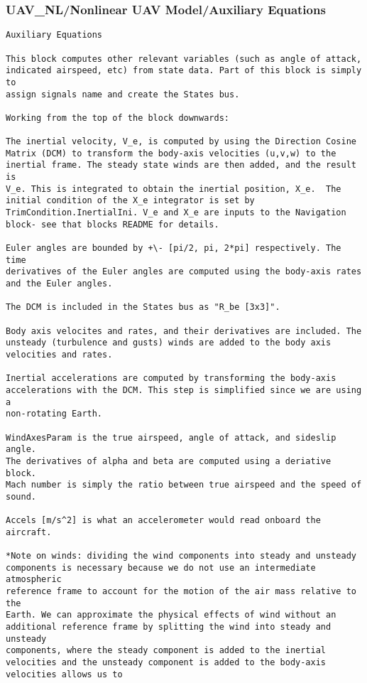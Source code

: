 \documentclass[12pt]{article}
\begin{document}
\subsubsection{UAV\_NL/Nonlinear UAV Model/Auxiliary Equations}
\begin{verbatim}
Auxiliary Equations

This block computes other relevant variables (such as angle of attack,
indicated airspeed, etc) from state data. Part of this block is simply to
assign signals name and create the States bus.

Working from the top of the block downwards:

The inertial velocity, V_e, is computed by using the Direction Cosine
Matrix (DCM) to transform the body-axis velocities (u,v,w) to the
inertial frame. The steady state winds are then added, and the result is
V_e. This is integrated to obtain the inertial position, X_e.  The
initial condition of the X_e integrator is set by
TrimCondition.InertialIni. V_e and X_e are inputs to the Navigation
block- see that blocks README for details.

Euler angles are bounded by +\- [pi/2, pi, 2*pi] respectively. The time 
derivatives of the Euler angles are computed using the body-axis rates
and the Euler angles.

The DCM is included in the States bus as "R_be [3x3]".

Body axis velocites and rates, and their derivatives are included. The 
unsteady (turbulence and gusts) winds are added to the body axis
velocities and rates.

Inertial accelerations are computed by transforming the body-axis
accelerations with the DCM. This step is simplified since we are using a
non-rotating Earth.

WindAxesParam is the true airspeed, angle of attack, and sideslip angle.
The derivatives of alpha and beta are computed using a deriative block.
Mach number is simply the ratio between true airspeed and the speed of
sound.

Accels [m/s^2] is what an accelerometer would read onboard the aircraft.

*Note on winds: dividing the wind components into steady and unsteady 
components is necessary because we do not use an intermediate atmospheric
reference frame to account for the motion of the air mass relative to the
Earth. We can approximate the physical effects of wind without an
additional reference frame by splitting the wind into steady and unsteady
components, where the steady component is added to the inertial
velocities and the unsteady component is added to the body-axis
velocities allows us to 

\end{verbatim}
\end{document}
